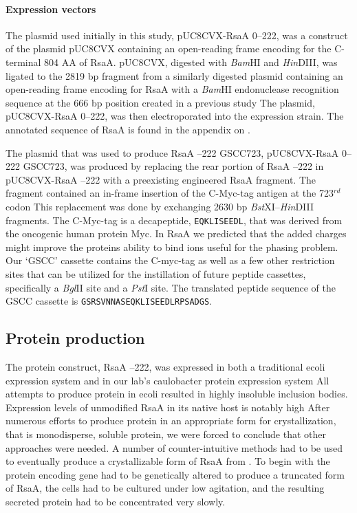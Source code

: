 \paragraph{Expression vectors} The plasmid used initially in this study, pUC8CVX-RsaA \del{}0--222, was a construct of the plasmid pUC8CVX containing an open-reading frame encoding for the C-terminal 804 AA of RsaA. pUC8CVX, digested with \textit{Bam}HI and \textit{Hin}DIII, was ligated to the 2819 bp fragment from a similarly digested plasmid containing an open-reading frame encoding for RsaA with a \textit{Bam}HI  endonuclease recognition sequence at the 666 bp position created in a previous study The plasmid, pUC8CVX-RsaA \del{}0--222, was then electroporated into the expression strain. The annotated sequence of RsaA is found in the appendix on .

The plasmid that was used to produce RsaA --222 GSCC723, pUC8CVX-RsaA \del{}0--222 GSCC723, was produced by replacing the rear portion of RsaA --222 in pUC8CVX-RsaA --222 with a preexisting engineered RsaA fragment. The fragment contained an in-frame insertion of the C-Myc-tag antigen at the 723$^{rd}$ codon This replacement was done by exchanging 2630 bp \textit{Bst}XI--\textit{Hin}DIII fragments. The C-Myc-tag is a decapeptide, \texttt{EQKLISEEDL}, that was derived from the oncogenic human protein Myc. In RsaA we predicted that the added charges might improve the proteins ability to bind  ions useful for the phasing problem. Our `GSCC' cassette contains the C-myc-tag as well as a few other restriction sites that can be utilized for the instillation of future peptide cassettes, specifically a \textit{Bgl}II site and a \textit{Pst}I site. The translated peptide sequence of the GSCC cassette is \texttt{GSRSVNNASEQKLISEEDLRPSADGS}. 

\subsection{Protein production}
\label{sub:crystal-protein-production}

The protein construct, RsaA --222, was expressed in both a traditional
\ac{ecoli} expression system and in our lab's \ac{caulobacter}
protein expression system
 All attempts to produce protein in \ac{ecoli}
resulted in highly insoluble inclusion bodies.
 Expression levels of unmodified RsaA in its native host is notably high 
After numerous efforts to produce protein in an appropriate form for
crystallization, that is monodisperse, soluble protein, we were forced to conclude that other approaches were needed. A number of
counter-intuitive methods had to be used to eventually produce a crystallizable form of
RsaA from \caulobacter. To begin with the protein encoding gene had to be genetically altered
to produce a truncated form of RsaA, the cells had to be cultured under low
agitation, and the resulting secreted protein had to be concentrated very slowly.

